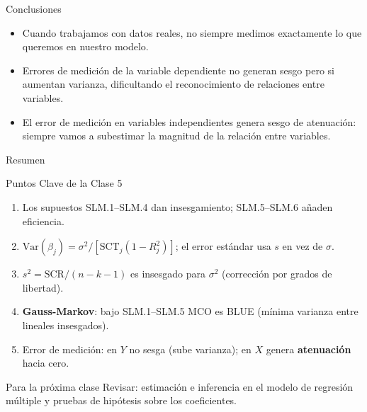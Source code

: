 \documentclass[10pt]{beamer}
\begin{document}
\begin{frame}{Conclusiones}
    \begin{itemize}
        \item Cuando trabajamos con datos reales, no siempre medimos exactamente lo que queremos en nuestro modelo.
        \item Errores de medición de la variable dependiente no generan sesgo pero si aumentan varianza, dificultando el reconocimiento de relaciones entre variables.
        \item El error de medición en variables independientes genera sesgo de atenuación: siempre vamos a subestimar la magnitud de la relación entre variables.
    \end{itemize}
\end{frame}

\begin{frame}{Resumen}

\begin{block}{Puntos Clave de la Clase 5}
\begin{enumerate}
    \item Los supuestos SLM.1--SLM.4 dan insesgamiento; SLM.5--SLM.6 añaden eficiencia.
    \item $\text{Var}(\hat\beta_j)=\sigma^2/[\text{SCT}_j(1-R_j^2)]$; el error estándar usa $s$ en vez de $\sigma$.
    \item $s^2=\text{SCR}/(n-k-1)$ es insesgado para $\sigma^2$ (corrección por grados de libertad).
    \item \textbf{Gauss-Markov}: bajo SLM.1--SLM.5 MCO es BLUE (mínima varianza entre lineales insesgados).
    \item Error de medición: en $Y$ no sesga (sube varianza); en $X$ genera \textbf{atenuación} hacia cero.
\end{enumerate}
\end{block}

\begin{alertblock}{Para la próxima clase}
Revisar: estimación e inferencia en el modelo de regresión múltiple y pruebas de hipótesis sobre los coeficientes.
\end{alertblock}

\end{frame}
\end{document}
